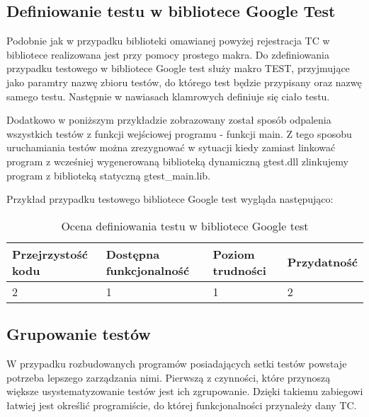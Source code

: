 \documentclass[12pt,a4paper,notitlepage]{report}
\begin{document}
\subsection{Definiowanie testu w bibliotece Google Test}

Podobnie jak w przypadku biblioteki omawianej powyżej rejestracja TC w bibliotece realizowana jest przy pomocy prostego makra. 
Do zdefiniowania przypadku testowego w bibliotece Google test służy makro TEST, przyjmujące jako paramtry nazwę zbioru testów, do którego test będzie przypisany oraz nazwę samego testu. Następnie w nawiasach klamrowych definiuje się ciało testu.

Dodatkowo w poniższym przykładzie zobrazowany został sposób odpalenia wszystkich testów z funkcji wejściowej programu - funkcji main. Z tego sposobu uruchamiania testów można zrezygnować w sytuacji kiedy zamiast linkować program z wcześniej wygenerowaną biblioteką dynamiczną gtest.dll zlinkujemy program z biblioteką statyczną gtest{\_}main.lib.

Przykład przypadku testowego bibliotece Google test wygląda następująco:

			

\begin{center}
			\begin{table}[!ht]
			\caption{Ocena definiowania testu w bibliotece Google test}
			\label{}
			\begin{tabular}[!hc]{|l|l|l|l|}
		\hline
		Przejrzystość kodu 	&	Dostępna funkcjonalność	&	Poziom trudności	&	Przydatność \\ \hline
		2					&	1						&	1					& 	2  			\\ \hline
			\end{tabular}
			\end{table} 
		\end{center}

\subsection{Grupowanie testów}

W przypadku rozbudowanych programów posiadających setki testów powstaje potrzeba lepszego zarządzania nimi. Pierwszą z czynności, które przynoszą większe usystematyzowanie testów jest ich zgrupowanie. Dzięki takiemu zabiegowi łatwiej jest określić programiście, do której funkcjonalności przynależy dany TC.
\end{document}
